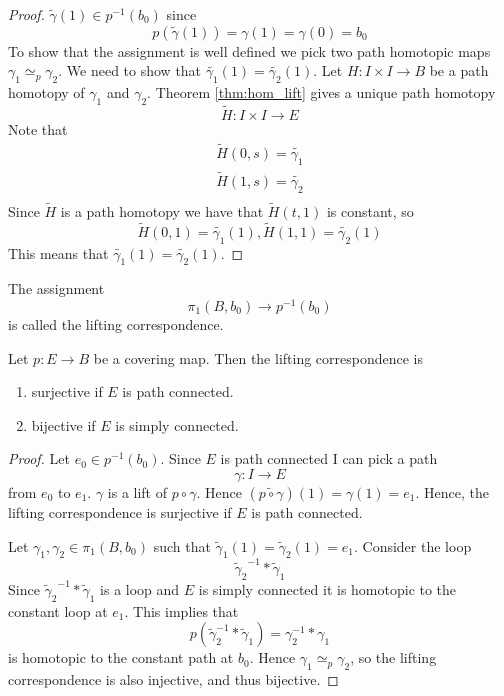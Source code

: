 \begin{proof}
  \( \tilde{\gamma}(1) \in {p}^{-1} (b_0) \) since
  \[
    p(\tilde{\gamma}(1)) = \gamma(1) = \gamma(0) = b_0
  \]
  To show that the assignment
  is well defined we pick two
  path homotopic maps \( \gamma_1 \simeq_p \gamma_2 \).
  We need to show that
  \( \tilde{\gamma_1}(1) = \tilde{\gamma_2}(1)\).
  Let \( H: I \times I \to B \) be a
  path homotopy of \( \gamma_1 \) and 
  \( \gamma_2 \).
  Theorem \ref{thm:hom_lift}
  gives a unique path homotopy
  \[
    \tilde{H}: I \times I \to E
  \]
  Note that
  \begin{align*}
    \tilde{H}(0, s) = \tilde{\gamma_1} \\
    \tilde{H}(1, s) = \tilde{\gamma_2} \\
  \end{align*}
  Since \( \tilde{H} \) is a path homotopy
  we have that \( \tilde{H}(t, 1) \) is
  constant, so
  \[
    \tilde{H}(0, 1) = \tilde{\gamma_1}(1), 
    \tilde{H}(1, 1) = \tilde{\gamma_2}(1)
  \]
  This means that \( \tilde{\gamma_1}(1)
  = \tilde{\gamma_2}(1) \).

\end{proof}

\begin{definition}
   The assignment
   \[
    \pi_1(B, b_0) \to {p}^{-1} (b_0)
   \]
   is called the lifting correspondence.
\end{definition}

\begin{theorem}
    Let \( p: E \to B \) be a covering map.
    Then the lifting correspondence is
    \begin{enumerate}
      \item surjective if \( E \) is path connected.
      \item bijective if \( E \) is simply connected.
    \end{enumerate}
\end{theorem}

\begin{proof}
    Let \( e_0 \in {p}^{-1} (b_0) \).
    Since \( E \) is path connected I 
    can pick a path
    \[
      \gamma: I \to E
    \]
    from \( e_0 \) to \( e_1 \).
    \( \gamma \) is a lift of
    \( p \circ \gamma \).
    Hence \( (\widetilde{p \circ \gamma})(1) = \gamma(1) = e_1 \).
    Hence, the lifting correspondence is surjective if
    \( E \) is path connected.
    
    Let \( \gamma_1, \gamma_2 \in \pi_1(B, b_0) \) such that
    \( \tilde{\gamma}_1(1) = \tilde{\gamma}_2(1) = e_1 \).
    Consider the loop \[ {\tilde{\gamma}_2}^{-1} * \tilde{\gamma}_1 \]
    Since \( {\tilde{\gamma}_2}^{-1} * \tilde{\gamma}_1 \) is a loop
    and \( E \) is simply connected it is homotopic to the constant loop
    at \( e_1 \).
    This implies that
    \[
      p (\tilde{\gamma}_2^{-1} * \tilde{\gamma}_1) = \gamma_2^{-1} * \gamma_1
    \]
    is homotopic to the constant path at \( b_0 \).
    Hence \( \gamma_1 \simeq_p \gamma_2 \), so
    the lifting correspondence is also injective,  
    and thus bijective.
\end{proof}

